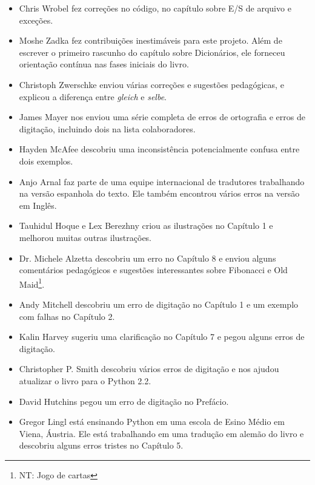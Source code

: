 \documentclass[10pt]{book}
\begin{document}
\begin {itemize}
\item Chris Wrobel fez correções no código, no capítulo sobre
E/S de arquivo e exceções. 

\item Moshe Zadka fez contribuições inestimáveis ​​para este projeto.
Além de escrever o primeiro rascunho do capítulo sobre Dicionários, ele
forneceu orientação contínua nas fases iniciais do livro.

\item Christoph Zwerschke enviou várias correções e
sugestões pedagógicas, e explicou a diferença entre {\em gleich}
e {\em selbe}.

\item James Mayer nos enviou uma série completa de erros de ortografia e
erros de digitação, incluindo dois na lista colaboradores.

\item Hayden McAfee descobriu uma inconsistência potencialmente confusa
entre dois exemplos.

\item Anjo Arnal faz parte de uma equipe internacional de tradutores
trabalhando na versão espanhola do texto. Ele também encontrou vários
erros na versão em Inglês.

\item Tauhidul Hoque e Lex Berezhny criou as ilustrações
no Capítulo 1 e melhorou muitas outras ilustrações.

\item Dr. Michele Alzetta descobriu um erro no Capítulo 8 e enviou
alguns comentários pedagógicos e sugestões interessantes sobre Fibonacci
e Old Maid\footnote{NT: Jogo de cartas}.

\item Andy Mitchell descobriu um erro de digitação no Capítulo 1 e um exemplo com falhas
no Capítulo 2.

\item Kalin Harvey sugeriu uma clarificação no Capítulo 7 e
pegou alguns erros de digitação.

\item Christopher P. Smith descobriu vários erros de digitação e nos ajudou
atualizar o livro para o Python 2.2.

\item David Hutchins pegou um erro de digitação no Prefácio.

\item Gregor Lingl está ensinando Python em uma escola de Esino Médio em Viena,
Áustria. Ele está trabalhando em uma tradução em alemão do livro
e descobriu alguns erros tristes no Capítulo 5.


\end{itemize}
\end{document}
